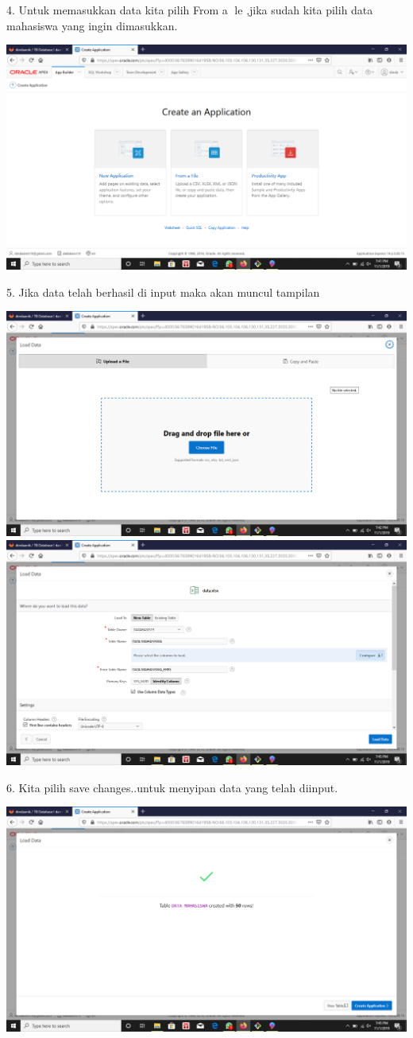 \documentclass{article}
\begin{document}
 \item 4. Untuk memasukkan data kita pilih From a le ,jika sudah kita pilih data
mahasiswa yang ingin dimasukkan.
\begin{center}
 \includegraphics[width=10cm\textwidth]{gambar/4.png}
\end{center}
 \item 5. Jika data telah berhasil di input maka akan muncul tampilan
\begin{center}
 \includegraphics[width=10cm\textwidth]{gambar/5.png}
 \includegraphics[width=10cm\textwidth]{gambar/6.png}
\end{center}
\item 6. Kita pilih save changes..untuk menyipan data yang telah diinput.
\begin{center}
 \includegraphics[width=10cm\textwidth]{gambar/7.png}
\end{center}
\end{document}
